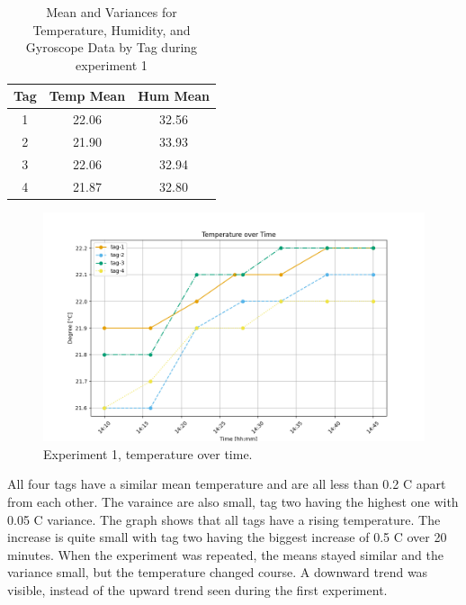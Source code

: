 \begin{table}[h!]
	\centering
	\begin{tabular}{|c|c|c|}
		\hline
		\textbf{Tag} & \textbf{Temp Mean} & \textbf{Hum Mean} \\
		\hline
		1 & 22.06 & 32.56 \\
		2 & 21.90 & 33.93 \\
		3 & 22.06 & 32.94 \\
		4 & 21.87 & 32.80 \\
		\hline
	\end{tabular}
	\caption{Mean and Variances for Temperature, Humidity, and Gyroscope Data by Tag during experiment 1}
	\label{t:exp1_means}
\end{table}

\begin{figure}[ht!]
	\includegraphics[width=\linewidth]{graphics/exp/exp1_temp_plot_0.png}
	\caption{Experiment 1, temperature over time.}
	\label{f:exp1_graphs_temp}
\end{figure}


All four tags have a similar mean temperature and are all less than 0.2 \degree C apart from each other.
The varaince are also small, tag two having the highest one with 0.05 \degree C variance. 
The graph shows that all tags have a rising temperature.
The increase is quite small with tag two having the biggest increase of 0.5 \degree C over 20 minutes.
When the experiment was repeated, the means stayed similar and the variance small, but the temperature changed course.
A downward trend was visible, instead of the upward trend seen during the first experiment.

